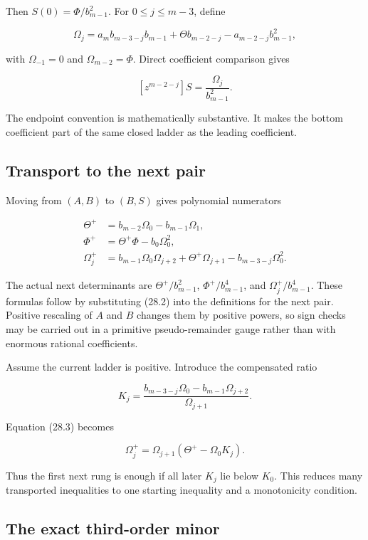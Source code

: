 \documentclass[
  10pt,
  a4paper,
  10pt,
  oneside,
  openany]{book}
\begin{document}
Then \(S(0)=\Phi/b_{m-1}^2\). For \(0\le j\le m-3\), define

\[
 \Omega_j=a_mb_{m-3-j}b_{m-1}
 +\Theta b_{m-2-j}-a_{m-2-j}b_{m-1}^2,
\]

with \(\Omega_{-1}=0\) and \(\Omega_{m-2}=\Phi\). Direct coefficient
comparison gives

\[
 [z^{m-2-j}]S=\frac{\Omega_j}{b_{m-1}^2}.
 \tag{28.2}\label{eq:28.2}
\]

The endpoint convention is mathematically substantive. It makes the
bottom coefficient part of the same closed ladder as the leading
coefficient.

\subsection{Transport to the next
pair}\label{transport-to-the-next-pair}

Moving from \((A,B)\) to \((B,S)\) gives polynomial numerators

\[
\begin{aligned}
 \Theta^+&=b_{m-2}\Omega_0-b_{m-1}\Omega_1,\\
 \Phi^+&=\Theta^+\Phi-b_0\Omega_0^2,\\
 \Omega_j^+&=b_{m-1}\Omega_0\Omega_{j+2}
 +\Theta^+\Omega_{j+1}-b_{m-3-j}\Omega_0^2.
\end{aligned}
 \tag{28.3}\label{eq:28.3}
\]

The actual next determinants are \(\Theta^+/b_{m-1}^2\),
\(\Phi^+/b_{m-1}^4\), and \(\Omega_j^+/b_{m-1}^4\). These formulas
follow by substituting (28.2) into the definitions for the next pair.
Positive rescaling of \(A\) and \(B\) changes them by positive powers,
so sign checks may be carried out in a primitive pseudo-remainder gauge
rather than with enormous rational coefficients.

Assume the current ladder is positive. Introduce the compensated ratio

\[
 K_j=\frac{b_{m-3-j}\Omega_0-b_{m-1}\Omega_{j+2}}
 {\Omega_{j+1}}.
\]

Equation (28.3) becomes

\[
 \Omega_j^+=\Omega_{j+1}(\Theta^+-\Omega_0K_j).
 \tag{28.4}\label{eq:28.4}
\]

Thus the first next rung is enough if all later \(K_j\) lie below
\(K_0\). This reduces many transported inequalities to one starting
inequality and a monotonicity condition.

\subsection{The exact third-order
minor}\label{the-exact-third-order-minor}
\end{document}
